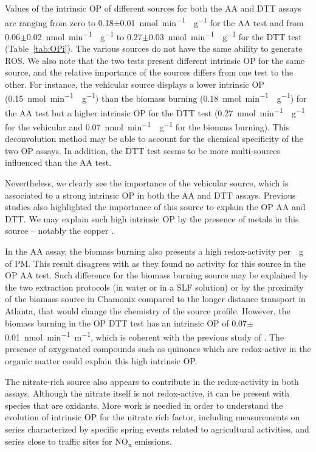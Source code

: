 \documentclass[acp, manuscript]{copernicus}
\begin{document}
Values of the intrinsic OP of different sources for both the AA and DTT assays
are ranging from zero to 0.18$\pm$0.01~\unit{nmol~min^{-1}~\mu g^{-1}} for the
AA test and from 0.06$\pm$0.02~\unit{nmol~min^{-1}~\mu g^{-1}} to
0.27$\pm$0.03~\unit{nmol~min^{-1}~\mu g^{-1}} for the DTT test
(Table~\ref{tab:OPi}). The various sources do not have the same ability to
generate ROS. We also note that the two tests present different intrinsic OP for
the same source, and the relative importance of the sources differs from one
test to the other. For instance, the vehicular source displays a lower intrinsic
OP (0.15~\unit{nmol~min^{-1}~\mu g^{-1}}) than the biomass burning
(0.18~\unit{nmol~min^{-1}~\mu g^{-1}}) for the AA test but a higher intrinsic OP
for the DTT test (0.27~\unit{nmol~min^{-1}~\mu g^{-1}} for the vehicular and
0.07~\unit{nmol~min^{-1}~\mu g^{-1}} for the biomass burning).  This
deconvolution method may be able to account for the chemical specificity of the
two OP assays. In addition, the DTT test seems to be more multi-sources
influenced than the AA test.

Nevertheless, we clearly see the importance of the vehicular source, which is
associated to a strong intrinsic OP in both the AA and DTT assays. Previous
studies \citep{bates_reactive_2015,fang_oxidative_2016,verma_reactive_2014} also
highlighted the importance of this source to explain the OP AA and DTT. We may
explain such high intrinsic OP by the presence of metals in this source
-- notably the copper \citep{charrier_oxidant_2015}.

In the AA assay, the biomass burning also presents a high redox-activity
per~\unit{\mu g} of PM. This result disagrees with \citet{fang_oxidative_2016}
as they found no activity for this source in the OP AA test. Such difference for
the biomass burning source may be explained by the two extraction protocols (in
water or in a SLF solution) or by the proximity of the biomass source in
Chamonix compared to the longer distance transport in Atlanta, that would change
the chemistry of the source profile. However, the biomass burning in the OP DTT
test has an intrinsic OP of 0.07$\pm$0.01~\unit{nmol~min^{-1}~m^{-1}}, which is
coherent with the previous study of \citet{fang_oxidative_2016}. The presence of
oxygenated compounds such as quinones which are redox-active in the organic
matter could explain this high intrinsic OP.

The nitrate-rich source also appears to contribute in the redox-activity in both
assays. Although the nitrate itself is not redox-active, it can be present with
species that are oxidants. More work is needied in order to understand the
evolution of intrinsic OP for the nitrate rich factor, including measurements on
series characterized by specific spring events related to agricultural
activities, and series close to traffic sites for NO\textsubscript{x} emissions.
\end{document}
